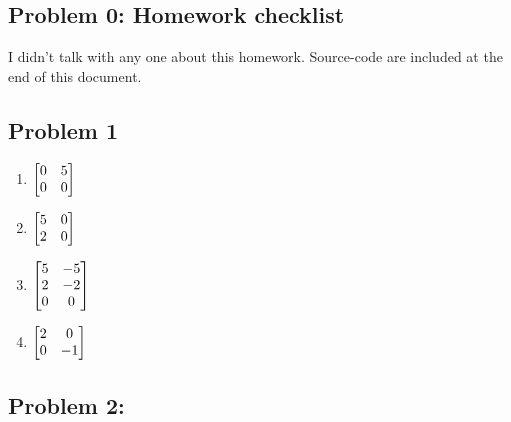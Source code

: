 \documentclass{article}
\begin{document}
 



\hypertarget{problem_0_homework_checklist_2}{}
\subsection*{{Problem 0: Homework checklist}}
\label{problem_0_homework_checklist_2}

\checkmark	I didn't talk with any one about this homework. \newline
\checkmark 	Source-code are included at the end of this document. 

\hypertarget{problem_0_homework_checklist_2}{}
\subsection*{{Problem 1}}
\label{problem_0_homework_checklist_2}

\begin{enumerate}
\item $\begin{bmatrix} 0 & 5 \\ 0 & 0 \end{bmatrix}$


\item $\begin{bmatrix} 5 & 0 \\ 2 & 0 \end{bmatrix}$


\item $\begin{bmatrix} 5 & -5 \\ 2 & -2 \\ 0 & 0 \end{bmatrix}$


\item $\begin{bmatrix} 2 & 0 \\ 0 & -1 \end{bmatrix}$

\end{enumerate}



\hypertarget{problem_0_homework_checklist_2}{}
\subsection*{{Problem 2: }}
\label{problem_0_homework_checklist_2}
\end{document}
